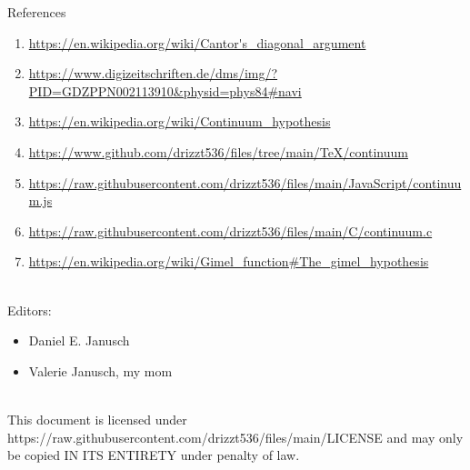 \documentclass[12pt]{article}
\begin{document}
\pagebreak\begin{section}{References}\label{sec:references}
	\begin{enumerate}
		\item\url{https://en.wikipedia.org/wiki/Cantor's\_diagonal\_argument}\\
		\label{ref:diagonal argument}

		\item\url{https://www.digizeitschriften.de/dms/img/?PID=GDZPPN002113910&physid=phys84#navi}\\
		\label{ref:cantor-1891}

		\item\url{https://en.wikipedia.org/wiki/Continuum\_hypothesis}\\
		\label{ref:continuum}

		\item\url{https://www.github.com/drizzt536/files/tree/main/TeX/continuum}\\
		\label{ref:files}

		\item\url{https://raw.githubusercontent.com/drizzt536/files/main/JavaScript/continuum.js}\\
		\label{ref:js-code}

		\item\url{https://raw.githubusercontent.com/drizzt536/files/main/C/continuum.c}\\
		\label{ref:c-code}


		\item\url{https://en.wikipedia.org/wiki/Gimel\_function\#The\_gimel\_hypothesis}\\
		\label{ref:gimel}
	\end{enumerate}
	\vspace{1em}\\
	Editors:
	\begin{itemize}
		\item Daniel E. Janusch
		\item Valerie Janusch, my mom
	\end{itemize}
	\vspace{3em}\\
	This document is licensed under https://raw.githubusercontent.com/drizzt536/files/main/LICENSE
	and may only be copied IN ITS ENTIRETY under penalty of law.
\end{section}
\end{document}
